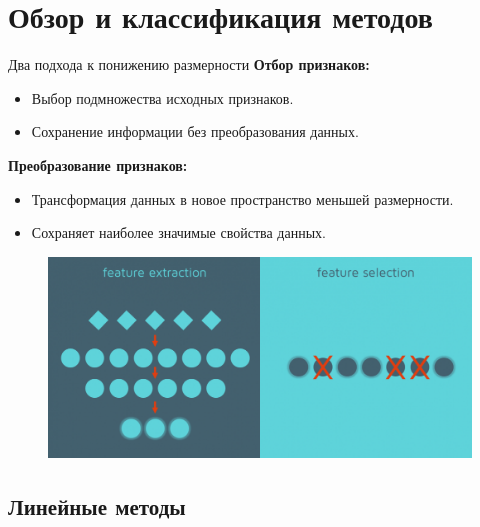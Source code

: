 \section{Обзор и классификация методов}

\begin{frame}{Два подхода к понижению размерности}
    \textbf{Отбор признаков:}
    \begin{itemize}
        \item Выбор подмножества исходных признаков.
        \item Сохранение информации без преобразования данных.
    \end{itemize}

    \textbf{Преобразование признаков:}
    \begin{itemize}
        \item Трансформация данных в новое пространство меньшей размерности.
        \item Сохраняет наиболее значимые свойства данных.
    \end{itemize}

    \begin{figure}
        \includegraphics[width=.5\textwidth]{../resources/methods/feature_selection_vs_extraction.png}
    \end{figure}
\end{frame}

\subsection{Линейные методы}

